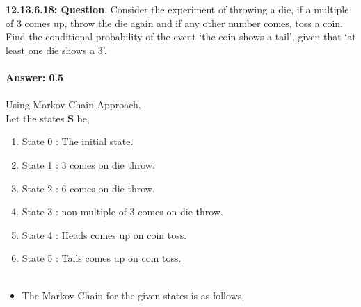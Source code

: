 \documentclass[journal,12pt,onecolumn]{IEEEtran}
\begin{document}
%
\textbf{12.13.6.18: Question}. Consider the experiment of throwing a die, if a multiple of 3 comes up, throw the die again and if any other number comes, toss a coin. Find the conditional probability
of the event ‘the coin shows a tail’, given that ‘at least one die shows a 3’.\\\\
\textbf{Answer: 0.5}\\\\
\solution
Using Markov Chain Approach,\\
Let the states \textbf{S} be,
\begin{enumerate}
\item State 0 : The initial state.\\
\item State 1 : 3 comes on die throw.\\
\item State 2 : 6 comes on die throw.\\
\item State 3 : non-multiple of 3 comes on die throw.\\
\item State 4 : Heads comes up on coin toss.\\
\item State 5 : Tails comes up on coin toss.\\\\
\end{enumerate}
\begin{itemize}
\item The Markov Chain for the given states is as follows,
\end{itemize}
\end{document}
